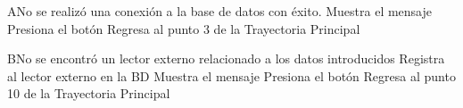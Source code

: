 
		\begin{UCtrayectoriaA}{A}{No se realizó una conexión a la base de datos con éxito.}
			\UCpaso[\UCsist] Muestra el mensaje 
			\UCpaso[\UCactor] Presiona el botón 
			\UCpaso[\UCsist] Regresa al punto 3 de la Trayectoria Principal
		\end{UCtrayectoriaA}


	
		\begin{UCtrayectoriaA}{B}{No se encontró un lector externo relacionado a los datos introducidos}
			\UCpaso[\UCsist] Registra al lector externo en la BD
			\UCpaso[\UCsist]	Muestra el mensaje 
			\UCpaso[\UCactor] Presiona el botón 
			\UCpaso[\UCsist] Regresa al punto 10 de la Trayectoria Principal
		\end{UCtrayectoriaA}
		
